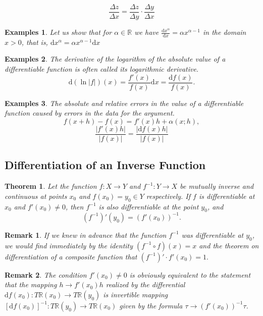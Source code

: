 \documentclass[a4paper,12pt]{article} %
\newtheorem{theorem}{Theorem}[section]
\newtheorem{example}{Examples}
\newtheorem*{remark}{Remark}
\begin{document}
\[
    \frac{\Delta z}{\Delta x} = \frac{\Delta z}{\Delta y} \cdot \frac{\Delta y}{\Delta x}
    \]
\begin{example}
    Let us show that for $\alpha \in \mathbb{R}$ we have $\frac{\mathrm{d}x^{\alpha}}{\mathrm{d}x} 
    = \alpha x^{\alpha -1}$ in the domain $x > 0$, that is, $\mathrm{d} x^{\alpha}  = \alpha x^{\alpha - 1}\mathrm{d}x$
\end{example}

\begin{example}
    The derivative of the logarithm of the absolute value of a differentiable 
    function is often called its logarithmic derivative.
    \[
        \mathrm{d}\left(\ln |f|\right)(x) = \frac{f'(x)}{f(x)} \mathrm{d}x = \frac{\mathrm{d}f(x)}{f(x)}.
        \]
\end{example}

\begin{example}
    The absolute and relative errors in the value of a differentiable function caused by 
    errors in the data for the argument.
    \[
        f(x+h) - f(x) = f'(x)h + \alpha(x;h),
    \]
    \[
        \frac{|f'(x)h|}{|f(x)|} = \frac{|\mathrm{d}f(x)h|}{|f(x)|}
        \]
\end{example}

\subsection{Differentiation of an Inverse Function}
\begin{theorem}
    Let the function $f: X \to Y$ and $f^{-1}: Y \to X$ be mutually inverse and continuous 
    at points $x_0$ and $f(x_0) = y_0 \in Y$ respectively. If $f$ is differentiable at 
    $x_0$ and $f'(x_0) \ne 0$, then $f^{-1}$ is also differentiable at the point $y_0$, and 
    \[
        \left(f^{-1}\right)'(y_0) = \left(f'(x_0)\right)^{-1}.
        \]
\end{theorem}

\begin{remark}
    If we knew in advance that the function $f^{-1}$ was differentiable at $y_0$, we would find 
    immediately by the identity $\left(f^{-1} \circ f\right)(x) = x$ and the theorem on differentiation 
    of a composite function that $\left(f^{-1}\right)'\cdot f'(x_0) = 1.$
\end{remark}

\begin{remark}
    The condition $f'(x_0) \ne 0$ is obviously equivalent to the statement that the mapping 
    $h \to f'(x_0)h$ realized by the differential $\mathrm{d}f(x_0):
    T\mathbb{R}(x_0) \to T\mathbb{R}(y_0)$ is invertible mapping $\left[\mathrm{d}f(x_0)\right]^{-1}: T\mathbb{R}(y_0)
     \to T\mathbb{R}(x_0)$ given by the formula $ \tau \to \left(f'(x_0)\right)^{-1}\tau$.
\end{remark}
\end{document}
